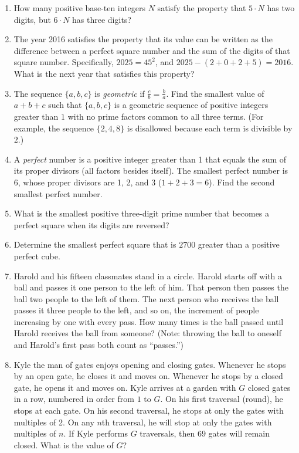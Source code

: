 \documentclass[11pt]{article}
\begin{document}
\begin{enumerate}[1.]
			\item How many positive base-ten integers $N$ satisfy the property that $5\cdot N$ has two digits, but $6\cdot N$ has three digits?
			
			\item The year 2016 satisfies the property that its value can be written as the difference between a perfect square number and the sum of the digits of that square number. Specifically, $2025 = 45^2$, and $2025 - (2 + 0 + 2 + 5) = 2016$. What is the next year that satisfies this property?
			
			\item The sequence $\{a, b, c\}$ is \textit{geometric} if $\frac{c}{b} = \frac{b}{a}$. Find the smallest value of $a + b + c$ such that $\{a, b, c\}$ is a geometric sequence of positive integers greater than $1$ with no prime factors common to all three terms. (For example, the sequence $\{2, 4, 8\}$ is disallowed because each term is divisible by $2$.)
			
			\item A \textit{perfect} number is a positive integer greater than 1 that equals the sum of its proper divisors (all factors besides itself). The smallest perfect number is 6, whose proper divisors are 1, 2, and 3 ($1 + 2 + 3 = 6$). Find the second smallest perfect number.
			
			\item What is the smallest positive three-digit prime number that becomes a perfect square when its digits are reversed?
			
			\item Determine the smallest perfect square that is $2700$ greater than a positive perfect cube.
			
			\item Harold and his fifteen classmates stand in a circle. Harold starts off with a ball and passes it one person to the left of him. That person then passes the ball two people to the left of them. The next person who receives the ball passes it three people to the left, and so on, the increment of people increasing by one with every pass. How many times is the ball passed until Harold receives the ball from someone? (Note: throwing the ball to oneself and Harold's first pass both count as ``passes.'')
			
			\item Kyle the man of gates enjoys opening and closing gates. Whenever he stops by an open gate, he closes it and moves on. Whenever he stops by a closed gate, he opens it and moves on. Kyle arrives at a garden with $G$ closed gates in a row, numbered in order from $1$ to $G$. On his first traversal (round), he stops at each gate. On his second traversal, he stops at only the gates with multiples of 2. On any $n$th traversal, he will stop at only the gates with multiples of $n$. If Kyle performs $G$ traversals, then $69$ gates will remain closed. What is the value of $G$?
		\end{enumerate}
\end{document}

